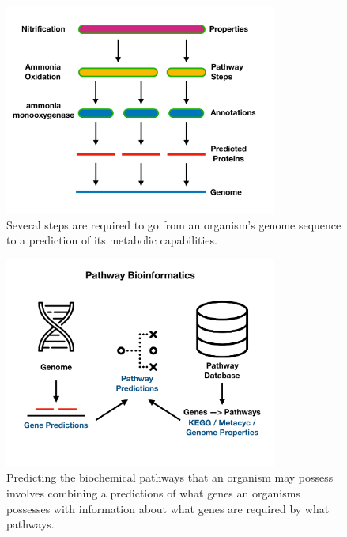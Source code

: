 \begin{figure}[!ht]
  \centering
	\includegraphics[width=0.8\textwidth]{media/pathway_analysis_steps.pdf}
	 \caption{Several steps are required to go from an organism's genome sequence to a prediction of its metabolic capabilities.}
	 \label{fig:pathway-analysis-steps}
\end{figure}

\begin{figure}[!ht]
  \centering
	\includegraphics[width=0.8\textwidth]{media/pathway_bioinformatics.pdf}
	 \caption{Predicting the biochemical pathways that an organism may possess involves combining a predictions of what genes an organisms possesses with information about what genes are required by what pathways.}
	 \label{fig:pathway-analysis-overview}
\end{figure}

